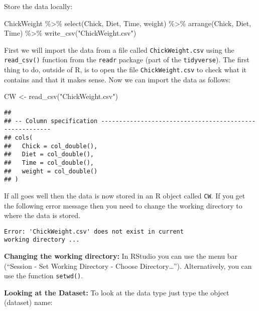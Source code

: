 \documentclass[
]{book}
\newenvironment{Shaded}{\begin{snugshade}}{\end{snugshade}}
\newcommand{\FunctionTok}[1]{\textcolor[rgb]{0.00,0.00,0.00}{#1}}
\newcommand{\NormalTok}[1]{#1}
\newcommand{\OtherTok}[1]{\textcolor[rgb]{0.56,0.35,0.01}{#1}}
\newcommand{\SpecialCharTok}[1]{\textcolor[rgb]{0.00,0.00,0.00}{#1}}
\newcommand{\StringTok}[1]{\textcolor[rgb]{0.31,0.60,0.02}{#1}}
\begin{document}
Store the data locally:

\begin{Shaded}
\begin{Highlighting}[]
\NormalTok{ChickWeight }\SpecialCharTok{\%\textgreater{}\%}
  \FunctionTok{select}\NormalTok{(Chick, Diet, Time, weight) }\SpecialCharTok{\%\textgreater{}\%} 
  \FunctionTok{arrange}\NormalTok{(Chick, Diet, Time) }\SpecialCharTok{\%\textgreater{}\%} 
  \FunctionTok{write\_csv}\NormalTok{(}\StringTok{"ChickWeight.csv"}\NormalTok{)}
\end{Highlighting}
\end{Shaded}

First we will import the data from a file called \texttt{ChickWeight.csv} using the \texttt{read\_csv()}
function from the \texttt{readr} package (part of the \texttt{tidyverse}). The first thing to do,
outside of R, is to open the file \texttt{ChickWeight.csv} to check what it contains and that
it makes sense. Now we can import the data as follows:

\begin{Shaded}
\begin{Highlighting}[]
\NormalTok{CW }\OtherTok{\textless{}{-}} \FunctionTok{read\_csv}\NormalTok{(}\StringTok{"ChickWeight.csv"}\NormalTok{)}
\end{Highlighting}
\end{Shaded}

\begin{verbatim}
## 
## -- Column specification --------------------------------------------------------
## cols(
##   Chick = col_double(),
##   Diet = col_double(),
##   Time = col_double(),
##   weight = col_double()
## )
\end{verbatim}

If all goes well then the data is now stored in an R object called \texttt{CW}. If you get the
following error message then you need to change the working directory to where the data is
stored.

\begin{verbatim}
Error: 'ChickWeight.csv' does not exist in current
working directory ...
\end{verbatim}

\textbf{Changing the working directory:}
In RStudio you can use the menu bar (``Session - Set Working Directory - Choose Directory\ldots{}''). Alternatively, you can use the function \texttt{setwd()}.

\hfill\break

\textbf{Looking at the Dataset:}
To look at the data type just type the object (dataset) name:
\end{document}
